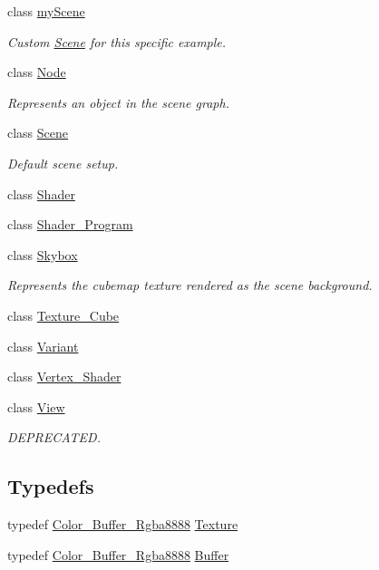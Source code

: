 \begin{DoxyCompactItemize}
class \mbox{\hyperlink{classoglsl_1_1my_scene}{my\+Scene}}
\begin{DoxyCompactList}\small\item\em Custom \mbox{\hyperlink{classoglsl_1_1_scene}{Scene}} for this specific example. \end{DoxyCompactList}\item 
class \mbox{\hyperlink{classoglsl_1_1_node}{Node}}
\begin{DoxyCompactList}\small\item\em Represents an object in the scene graph. \end{DoxyCompactList}\item 
class \mbox{\hyperlink{classoglsl_1_1_scene}{Scene}}
\begin{DoxyCompactList}\small\item\em Default scene setup. \end{DoxyCompactList}\item 
class \mbox{\hyperlink{classoglsl_1_1_shader}{Shader}}
\item 
class \mbox{\hyperlink{classoglsl_1_1_shader___program}{Shader\+\_\+\+Program}}
\item 
class \mbox{\hyperlink{classoglsl_1_1_skybox}{Skybox}}
\begin{DoxyCompactList}\small\item\em Represents the cubemap texture rendered as the scene background. \end{DoxyCompactList}\item 
class \mbox{\hyperlink{classoglsl_1_1_texture___cube}{Texture\+\_\+\+Cube}}
\item 
class \mbox{\hyperlink{classoglsl_1_1_variant}{Variant}}
\item 
class \mbox{\hyperlink{classoglsl_1_1_vertex___shader}{Vertex\+\_\+\+Shader}}
\item 
class \mbox{\hyperlink{classoglsl_1_1_view}{View}}
\begin{DoxyCompactList}\small\item\em D\+E\+P\+R\+E\+C\+A\+T\+ED. \end{DoxyCompactList}\end{DoxyCompactItemize}
\subsection*{Typedefs}
\begin{DoxyCompactItemize}
\item 
typedef \mbox{\hyperlink{classoglsl_1_1_color___buffer___rgba8888}{Color\+\_\+\+Buffer\+\_\+\+Rgba8888}} \mbox{\hyperlink{namespaceoglsl_a3f3bf2d9553fda1a155d7492ee30d7d0}{Texture}}
\item 
typedef \mbox{\hyperlink{classoglsl_1_1_color___buffer___rgba8888}{Color\+\_\+\+Buffer\+\_\+\+Rgba8888}} \mbox{\hyperlink{namespaceoglsl_a54a481d3b94c4faefeb16560e4b85a34}{Buffer}}
\end{DoxyCompactItemize}


